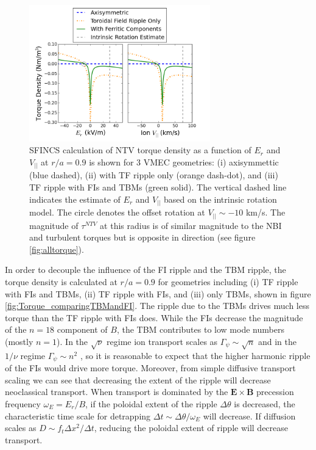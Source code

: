 \documentclass{article}
\numberwithin{figure}{section}
\numberwithin{equation}{section}
\begin{document}
\begin{figure}[h!]
\centering
\includegraphics[width=0.7\textwidth]{Torque_ErandV.png}
\caption{\label{fig:Torque_ErandV} SFINCS calculation of NTV torque density as a function of $E_r$ and $V_{||}$ at $r/a = 0.9$ is shown for 3 VMEC geometries: (i) axisymmettic (blue dashed), (ii) with TF ripple only (orange dash-dot), and (iii) TF ripple with FIs and TBMs (green solid). The vertical dashed line indicates the estimate of $E_r$ and $V_{||}$ based on the intrinsic rotation model. The circle denotes the offset rotation at $V_{||} \sim -10$ km/s. The magnitude of $\tau^{NTV}$ at this radius is of similar magnitude to the NBI and turbulent torques but is opposite in direction (see figure \ref{fig:alltorque}).}
\end{figure}

In order to decouple the influence of the FI ripple and the TBM ripple, the torque density is calculated at $r/a = 0.9$ for geometries including (i) TF ripple with FIs and TBMs, (ii) TF ripple with FIs, and (iii) only TBMs, shown in figure \ref{fig:Torque_comparingTBMandFI}. The ripple due to the TBMs drives much less torque than the TF ripple with FIs does.  While the FIs decrease the magnitude of the $n = 18$ component of $B$, the TBM contributes to low mode numbers (mostly $n = 1$). In the $\sqrt{\nu}$ regime ion transport scales as $\Gamma_{\psi} \sim \sqrt{n}$ and in the $1/\nu$ regime $\Gamma_{\psi} \sim n^2$ \cite{Shaing2010}, so it is reasonable to expect that the higher harmonic ripple of the FIs would drive more torque. Moreover, from simple diffusive transport scaling we can see that decreasing the extent of the ripple will decrease neoclassical transport. When transport is dominated by the $\bm{E} \times \bm{B}$ precession frequency $\omega_E = E_r/B$, if the poloidal extent of the ripple $\Delta \theta$ is decreased, the characteristic time scale for detrapping $\Delta t \sim \Delta \theta/ \omega_E$ will decrease. If diffusion scales as $D \sim f_t \Delta x^2/\Delta t$, reducing the poloidal extent of ripple will decrease transport. 
\end{document}
